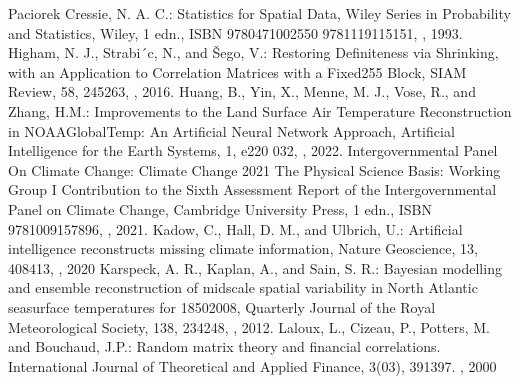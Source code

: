 \documentclass[letterpaper,10pt,english]{sphinxmanual}
\begin{document}
\begin{sphinxthebibliography}{Paciorek}
\sphinxAtStartPar
{}
\sphinxAtStartPar
Cressie, N. A. C.: Statistics for Spatial Data, Wiley Series in Probability and Statistics, Wiley, 1 edn., ISBN 978\sphinxhyphen{}0\sphinxhyphen{}471\sphinxhyphen{}00255\sphinxhyphen{}0 978\sphinxhyphen{}1\sphinxhyphen{}119\sphinxhyphen{}11515\sphinxhyphen{}1, , 1993.
\sphinxAtStartPar
Higham, N. J., Strabi´c, N., and Šego, V.: Restoring Definiteness via Shrinking, with an Application to Correlation Matrices with a Fixed255 Block, SIAM Review, 58, 245\textendash{}263, , 2016.
\sphinxAtStartPar
Huang, B., Yin, X., Menne, M. J., Vose, R., and Zhang, H.\sphinxhyphen{}M.: Improvements to the Land Surface Air Temperature Reconstruction in NOAAGlobalTemp: An Artificial Neural Network Approach, Artificial Intelligence for the Earth Systems, 1, e220 032, , 2022.
\sphinxAtStartPar
Intergovernmental Panel On Climate Change: Climate Change 2021 \textendash{} The Physical Science Basis: Working Group I Contribution to the Sixth Assessment Report of the Intergovernmental Panel on Climate Change, Cambridge University Press, 1 edn., ISBN 978\sphinxhyphen{}1\sphinxhyphen{}00\sphinxhyphen{}915789\sphinxhyphen{}6, , 2021.
\sphinxAtStartPar
Kadow, C., Hall, D. M., and Ulbrich, U.: Artificial intelligence reconstructs missing climate information, Nature Geoscience, 13, 408\textendash{}413, , 2020
\sphinxAtStartPar
Karspeck, A. R., Kaplan, A., and Sain, S. R.: Bayesian modelling and ensemble reconstruction of mid\sphinxhyphen{}scale spatial variability in North Atlantic sea\sphinxhyphen{}surface temperatures for 1850\sphinxhyphen{}2008, Quarterly Journal of the Royal Meteorological Society, 138, 234\textendash{}248, , 2012.
\sphinxAtStartPar
Laloux, L., Cizeau, P., Potters, M. and Bouchaud, J.P.: Random matrix theory and financial correlations. International Journal of Theoretical and Applied Finance, 3(03), 391\sphinxhyphen{}397. , 2000

\end{sphinxthebibliography}
\end{document}
